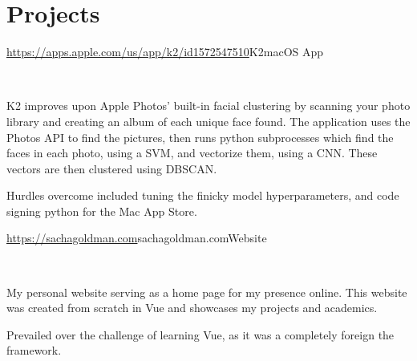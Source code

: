 \documentclass[]{style}
\begin{document}

\section{Projects}

\begin{entrylist}


\vspace{2mm}

\entry
{\url{https://apps.apple.com/us/app/k2/id1572547510}{K2}}{macOS App}
{ ~ \vspace{-2.5mm}

  

K2 improves upon Apple Photos' built-in facial clustering by scanning your photo library and creating an album of each unique face found. The application uses the Photos API to find the pictures, then runs python subprocesses which find the faces in each photo, using a SVM, and vectorize them, using a CNN. These vectors are then clustered using DBSCAN.
\vspace{1mm}

Hurdles overcome included tuning the finicky model hyperparameters, and code signing python for the Mac App Store.}


\vspace{2mm}

\entry
{\url{https://sachagoldman.com}{sachagoldman.com}}{Website}
{ ~ \vspace{-2.5mm}

 

My personal website serving as a home page for my presence online. This website was created from scratch in Vue and showcases my projects and academics. 
\vspace{1mm}

Prevailed over the challenge of learning Vue, as it was a completely foreign the framework.}

\end{entrylist}
\end{document}
